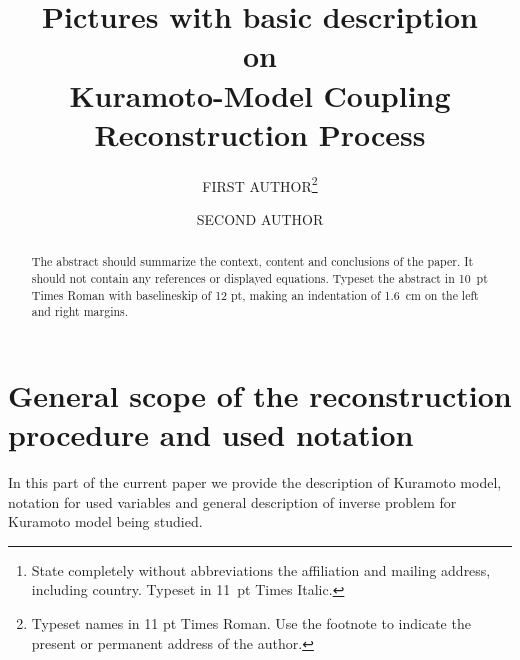 \documentclass{ws-ijbc}
\begin{document}
\catchline{}{}{}{}{} %


\title{Pictures with basic description\\
on \\
Kuramoto-Model Coupling Reconstruction Process}

\author{FIRST AUTHOR\footnote{Typeset names in 11 pt Times Roman.
Use the footnote to indicate the present or permanent address of
the author.}}

\address{University Department, University Name, Address\\
City, State ZIP/Zone, Country\\
fauthor@university.com\footnote{State completely without
abbreviations the affiliation and mailing address, including
country. Typeset in 11~pt Times Italic.}}

\author{SECOND AUTHOR}
\address{Group, Company, Address\\
City, State ZIP/Zone, Country\\
sauthor@company.com}

\maketitle

\begin{history}
\end{history}

\begin{abstract}
The abstract should summarize the context, content and conclusions
of the paper. It should not contain any references or displayed
equations. Typeset the abstract in 10~pt Times Roman with
baselineskip of 12 pt, making an indentation of 1.6~cm on the left
and right margins.
\end{abstract}



\section{General scope of the reconstruction procedure and used notation}

In this part of the current paper we provide the description of Kuramoto
model, notation for used variables and general description of inverse
problem for Kuramoto model being studied.
\end{document}

